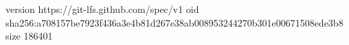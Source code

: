 version https://git-lfs.github.com/spec/v1
oid sha256:a708157be7923f436a3e4b81d267e38ab008953244270b301e00671508ede3b8
size 186401
